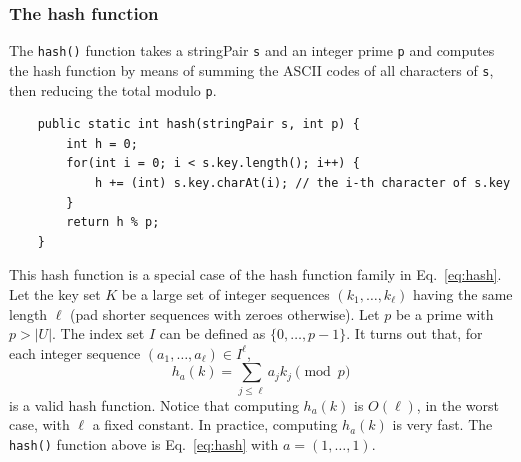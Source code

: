 \documentclass[a4paper]{book}
\theoremstyle{changebreak}                %
\begin{document}
\subsubsection{The hash function}
\label{s:hash:function}
The {\tt hash()} function takes a stringPair {\tt s} and an integer
prime {\tt p} and computes the hash function by means of summing the ASCII codes of all
characters of {\tt s}, then reducing the total modulo {\tt p}.
\begin{verbatim}
    public static int hash(stringPair s, int p) {
        int h = 0;
        for(int i = 0; i < s.key.length(); i++) {
            h += (int) s.key.charAt(i); // the i-th character of s.key
        }
        return h % p;
    }
\end{verbatim}

This hash function is a special case of the hash function
family in Eq.~\eqref{eq:hash}. Let the
key set $K$ be a large set of integer
sequences $(k_1,\ldots,k_\ell)$ having the same length
$\ell$ (pad shorter sequences with zeroes otherwise). Let $p$ be a
prime with $p>|U|$. The index set $I$ can be defined as
$\{0,\ldots,p-1\}$. It turns out that, for each integer sequence
$(a_1,\ldots,a_\ell)\in I^\ell$,
\begin{equation}
   h_a(k) = \sum_{j\le\ell} a_jk_j \pmod p \label{eq:hash}
\end{equation}
is a valid hash function. Notice that computing $h_a(k)$ is $O(\ell)$,
in the worst case, with $\ell$ a fixed constant. In practice,
computing $h_a(k)$ is very fast. The {\tt hash()} function above is
Eq.~\eqref{eq:hash} with $a=(1,\ldots,1)$.
\end{document}
